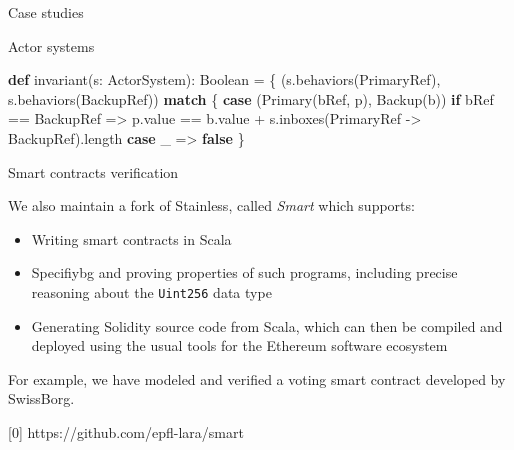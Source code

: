 \documentclass[
  ignorenonframetext,
]{beamer}
\newenvironment{Shaded}{}{}
\newcommand{\FunctionTok}[1]{\textcolor[rgb]{0.02,0.16,0.49}{#1}}
\newcommand{\KeywordTok}[1]{\textcolor[rgb]{0.00,0.44,0.13}{\textbf{#1}}}
\newcommand{\NormalTok}[1]{#1}
\providecommand{\tightlist}{%
  \setlength{\itemsep}{0pt}\setlength{\parskip}{0pt}}
\begin{document}
\begin{frame}[fragile]{Case studies}
\begin{block}{Actor systems}
\begin{Shaded}
\begin{Highlighting}[]
  \KeywordTok{def} \FunctionTok{invariant}\NormalTok{(s: ActorSystem): Boolean = \{}
\NormalTok{    (s.}\FunctionTok{behaviors}\NormalTok{(PrimaryRef), s.}\FunctionTok{behaviors}\NormalTok{(BackupRef)) }\KeywordTok{match}\NormalTok{ \{}
      \KeywordTok{case}\NormalTok{ (}\FunctionTok{Primary}\NormalTok{(bRef, p), }\FunctionTok{Backup}\NormalTok{(b)) }\KeywordTok{if}\NormalTok{ bRef == BackupRef =>}
\NormalTok{        p.}\FunctionTok{value}\NormalTok{ == b.}\FunctionTok{value}\NormalTok{ + s.}\FunctionTok{inboxes}\NormalTok{(PrimaryRef -> BackupRef).}\FunctionTok{length}
      \KeywordTok{case}\NormalTok{ _ => }\KeywordTok{false}
\NormalTok{  \}}
\end{Highlighting}
\end{Shaded}

\end{block}

\begin{block}{Smart contracts verification}

We also maintain a fork of Stainless, called \emph{Smart} which
supports:

\begin{itemize}
\tightlist
\item
  Writing smart contracts in Scala
\item
  Specifiybg and proving properties of such programs, including precise
  reasoning about the \texttt{Uint256} data type
\item
  Generating Solidity source code from Scala, which can then be compiled
  and deployed using the usual tools for the Ethereum software ecosystem
\end{itemize}

For example, we have modeled and verified a voting smart contract
developed by SwissBorg.

{[}0{]} https://github.com/epfl-lara/smart

\end{block}

\end{frame}
\end{document}
